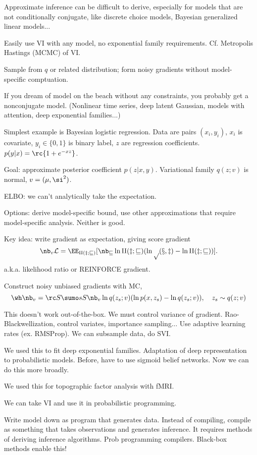 Approximate inference can be difficult to derive, especially for models that are not conditionally conjugate, like discrete choice models, Bayesian generalized linear models...

Easily use VI with any model, no exponential family requirements. Cf. Metropolis Hastings  (MCMC) of VI.

Sample from $q$ or related distribution; form noisy gradients without model-specific comptuation.

If you dream of model on the beach without any constraints, you probably get a nonconjugate model. (Nonlinear time series, deep latent Gaussian, models with attention, deep exponential families...)

Simplest example is Bayesian logistic regression. Data are pairs $(x_i,y_i)$, $x_i$ is covariate, $y_i\in \{0,1\}$ is binary label, $z$ are regression coefficients. $p(y|x)= \rc{1+e^{-xz}}$.

Goal: approximate posterior coefficient $p(z|x,y)$. Variational family $q(z;v)$ is normal, $v=(\mu, \si^2)$. 

ELBO: we can't analytically take the expectation.

Options: derive model-specific bound, use other approximations that require model-specific analysis. Neither is good.

Key idea: write gradient as expectation, giving score gradient
$$
\nb_v \cal L = \EE_{q(z;v)} [\nb_v \ln q(z;v) (\ln p(x,z) - \ln q(z;v))].
$$
a.k.a. likelihood ratio or REINFORCE gradient.

Construct noisy unbiased gradients with MC,
$$
\wh \nb_v = \rc S \sumo sS \nb_v \ln q(z_s;v)(\ln p(x,z_s)-\ln q(z_s;v)), \quad z_s\sim q(z;v)
$$

This doesn't work out-of-the-box. We must control variance of gradient. Rao-Blackwellization, control variates, importance sampling... Use adaptive learning rates (ex. RMSProp). We can subsample data, do SVI.

We used this to fit deep exponential families. Adaptation of deep representation to probabilistic models. Before, have to use sigmoid belief networks. Now we can do this more broadly.

We used this for topographic factor analysis with fMRI.

We can take VI and use it in probabilistic programming.

Write model down as program that generates data. Instead of compiling, compile as something that takes observations and generates inference. It requires methods of deriving inference algorithms. Prob programming compilers. Black-box methods enable this!

